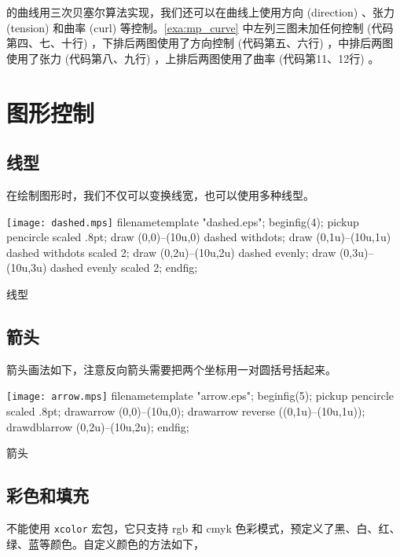 \MP 的曲线用三次贝塞尔算法实现，我们还可以在曲线上使用方向 (direction) 、张力 (tension) 和曲率 (curl) 等控制。\autoref{exa:mp_curve} 中左列三图未加任何控制 (代码第四、七、十行) ，下排后两图使用了方向控制 (代码第五、六行) ，中排后两图使用了张力 (代码第八、九行) ，上排后两图使用了曲率 (代码第11、12行) 。

\section{图形控制}
\subsection{线型}

在绘制图形时，我们不仅可以变换线宽，也可以使用多种线型。

\begin{example}[htbp]
\begin{FBTDemo}[numbers=left]{\texttt{[image: dashed.mps]}}
filenametemplate "dashed.eps";
beginfig(4);
pickup pencircle scaled .8pt;
draw (0,0)--(10u,0) dashed withdots;
draw (0,1u)--(10u,1u) dashed withdots scaled 2;
draw (0,2u)--(10u,2u) dashed evenly;
draw (0,3u)--(10u,3u) dashed evenly scaled 2;
endfig;
\end{FBTDemo}
\caption{\MP 线型}
\label{exa:mp_dashed}
\end{example}

\subsection{箭头}

箭头画法如下，注意反向箭头需要把两个坐标用一对圆括号括起来。

\begin{example}[htbp]
\begin{FBTDemo}[numbers=left]{\texttt{[image: arrow.mps]}}
filenametemplate "arrow.eps";
beginfig(5);
pickup pencircle scaled .8pt;
drawarrow (0,0)--(10u,0);
drawarrow reverse ((0,1u)--(10u,1u));
drawdblarrow (0,2u)--(10u,2u);
endfig;
\end{FBTDemo}
\caption{\MP 箭头}
\label{exa:mp_arrow}
\end{example}

\subsection{彩色和填充}

\MP 不能使用 \texttt{xcolor} 宏包，它只支持 rgb 和 cmyk 色彩模式，预定义了黑、白、红、绿、蓝等颜色。自定义颜色的方法如下，

